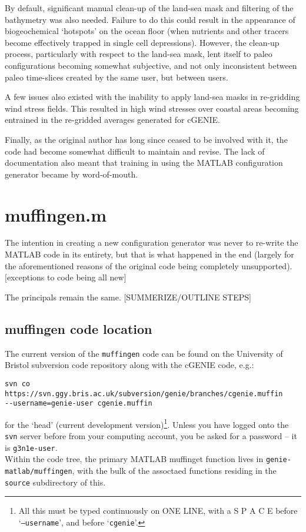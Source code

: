 \documentclass[11pt,fleqn]{book} %
\begin{document}
By default, significant manual clean-up of the land-sea mask and filtering of the bathymetry was also needed. Failure to do this could result in the appearance of biogeochemical `hotspots' on the ocean floor (when nutrients and other tracers become effectively trapped in single cell depressions). However, the clean-up process, particularly with respect to the land-sea mask, lent itself to paleo configurations becoming somewhat subjective, and not only inconsistent between paleo time-slices created by the same user, but between users.

A few issues also existed with the inability to apply land-sea masks in re-gridding wind stress fields. This resulted in high wind stresses over coastal areas becoming entrained in the re-gridded averages generated for cGENIE.

Finally, as the original author has long since ceased to be involved with it, the code had become somewhat difficult to maintain and revise. The lack of documentation also meant that training in using the MATLAB configuration generator became by word-of-mouth.


\section{muffingen.m}

The intention in creating a new configuration generator was never to re-write the MATLAB code in its entirety, but that is what happened in the end (largely for the aforementioned reasons of the original code being completely unsupported). [exceptions to code being all new]

The principals remain the same. [SUMMERIZE/OUTLINE STEPS]



\subsection{muffingen code location}

The current version of the \texttt{muffingen} code can be found on the University of Bristol subversion code repository along with the cGENIE code, e.g.:
\vspace{-5pt}\begin{verbatim}
svn co https://svn.ggy.bris.ac.uk/subversion/genie/branches/cgenie.muffin
--username=genie-user cgenie.muffin
\end{verbatim}\vspace{-5pt}
for the `head' (current development version)\footnote{All this must be typed continuously on ONE LINE, with a S P A C E before `\texttt{--username}', and before `\texttt{cgenie}'.}.
Unless you have logged onto the \texttt{svn} server before from your computing account, you be asked for a password -- it is \texttt{g3n1e-user}.
\\Within the code tree, the primary MATLAB muffinget function lives in \texttt{genie-matlab/muffingen}, with the bulk of the assoctaed functions residing in the \texttt{source} subdirectory of this. 
\end{document}
